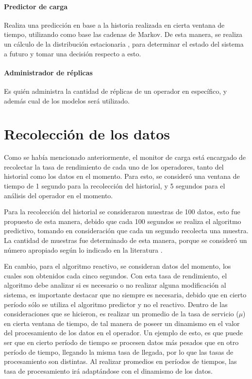 \paragraph{Predictor de carga} Realiza una predicción en base a la historia realizada en cierta ventana de tiempo, utilizando como base las cadenas de Markov. De esta manera, se realiza un cálculo de la distribución estacionaria \citep{Papoulis1984}, para determinar el estado del sistema a futuro y tomar una decisión respecto a esto.

\paragraph{Administrador de réplicas} Es quién administra la cantidad de réplicas de un operador en específico, y además cual de los modelos será utilizado.

\section{Recolección de los datos}
Como se había mencionado anteriormente, el monitor de carga está encargado de recolectar la tasa de rendimiento de cada uno de los operadores, tanto del historial como los datos en el momento. Para esto, se consideró una ventana de tiempo de 1 segundo para la recolección del historial, y 5 segundos para el análisis del operador en el momento.

Para la recolección del historial se consideraron muestras de 100 datos, esto fue propuesto de esta manera, debido que cada 100 segundos se realiza el algoritmo predictivo, tomando en consideración que cada un segundo recolecta una muestra. La cantidad de muestras fue determinado de esta manera, porque se consideró un número apropiado según lo indicado en la literatura \citep{ching2006markov}.

En cambio, para el algoritmo reactivo, se consideran datos del momento, los cuales son obtenidos cada cinco segundos. Con esta tasa de rendimiento, el algoritmo debe analizar si es necesario o no realizar alguna modificación al sistema, es importante destacar que no siempre es necesaria, debido que en cierto período sólo se utiliza el algoritmo predictor y no el reactivo. Dentro de las consideraciones que se hicieron, es realizar un promedio de la tasa de servicio ($\mu$) en cierta ventana de tiempo, de tal manera de poseer un dinamismo en el valor del procesamiento de los datos en el operador. Un ejemplo de esto, es que puede ser que en cierto período de tiempo se procesen datos más pesados que en otro período de tiempo, llegando la misma tasa de llegada, por lo que las tasas de procesamiento son distintas. Al realizar promedios en períodos de tiempos, las tasa de procesamiento irá adaptándose con el dinamismo de los datos.

